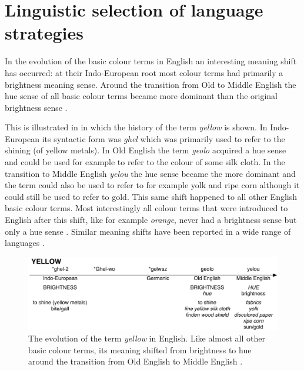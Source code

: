 \chapter{Linguistic selection of language strategies}
\label{s:strategy-selection}

\setcounter{figure}{2}

In the evolution of the basic colour terms in English an interesting
meaning shift has occurred: at their Indo-European root most colour
terms had primarily a brightness meaning sense. Around the transition
from Old to Middle English the hue sense of all basic colour terms
became more dominant than the original brightness sense
\citep{casson97shift}.

This is illustrated in  in which the
history of the term \textit{yellow} is shown. In Indo-European its
syntactic form was \textit{ghel} which was primarily used to refer to the
shining (of yellow metals). In Old English the term \textit{geolo} acquired
a hue sense and could be used for example to refer to the colour of
some silk cloth. In the transition to Middle English \textit{yelou} the hue
sense became the more dominant and the term could also be used to
refer to for example yolk and ripe corn although it could still be
used to refer to gold. This same shift happened to all other English
basic colour terms. Most interestingly all colour terms that were
introduced to English after this shift, like for example \textit{orange},
never had a brightness sense but only a hue sense
\citep{casson97shift}. Similar meaning shifts have been reported in a
wide range of languages \citep{maclaury92brightness}.

\begin{figure}[htbp]
  \begin{center}
    \includegraphics[width=\textwidth]{./selection/figures/history-yellow.pdf}
   \caption[The evolution of the term \textit{yellow} in English]{The
     evolution of the term \textit{yellow} in English. Like almost all
     other basic colour terms, its meaning shifted from brightness to
     hue around the transition from Old English to Middle
     English \citep{casson97shift}.}
    \label{f:ls-history-yellow}
  \end{center}
\end{figure}

